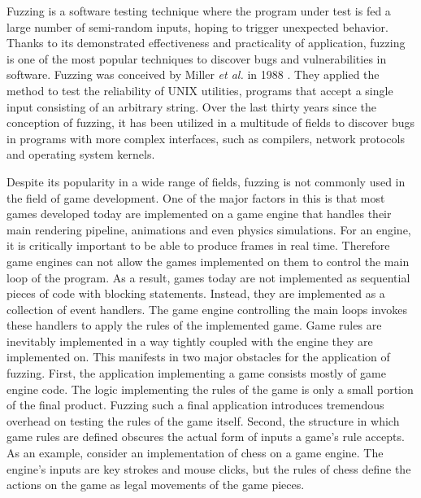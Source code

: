 Fuzzing is a software testing technique where the program under test is fed a large number of semi-random inputs, hoping to trigger unexpected behavior.
Thanks to its demonstrated effectiveness and practicality of application, fuzzing is one of the most popular techniques to discover bugs and vulnerabilities in software.
Fuzzing was conceived by Miller \textit{et al.} in 1988 \cite{Miller1999}.
They applied the method to test the reliability of UNIX utilities, programs that accept a single input consisting of an arbitrary string.
Over the last thirty years since the conception of fuzzing, it has been utilized in a multitude of fields to discover bugs in programs with more complex interfaces, such as compilers, network protocols and operating system kernels.

Despite its popularity in a wide range of fields, fuzzing is not commonly used in the field of game development.
One of the major factors in this is that most games developed today are implemented on a game engine that handles their main rendering pipeline, animations and even physics simulations.
For an engine, it is critically important to be able to produce frames in real time.
Therefore game engines can not allow the games implemented on them to control the main loop of the program.
As a result, games today are not implemented as sequential pieces of code with blocking statements.
Instead, they are implemented as a collection of event handlers.
The game engine controlling the main loops invokes these handlers to apply the rules of the implemented game.
Game rules are inevitably implemented in a way tightly coupled with the engine they are implemented on.
This manifests in two major obstacles for the application of fuzzing.
First, the application implementing a game consists mostly of game engine code.
The logic implementing the rules of the game is only a small portion of the final product.
Fuzzing such a final application introduces tremendous overhead on testing the rules of the game itself.
Second, the structure in which game rules are defined obscures the actual form of inputs a game's rule accepts.
As an example, consider an implementation of chess on a game engine.
The engine's inputs are key strokes and mouse clicks, but the rules of chess define the actions on the game as legal movements of the game pieces.

